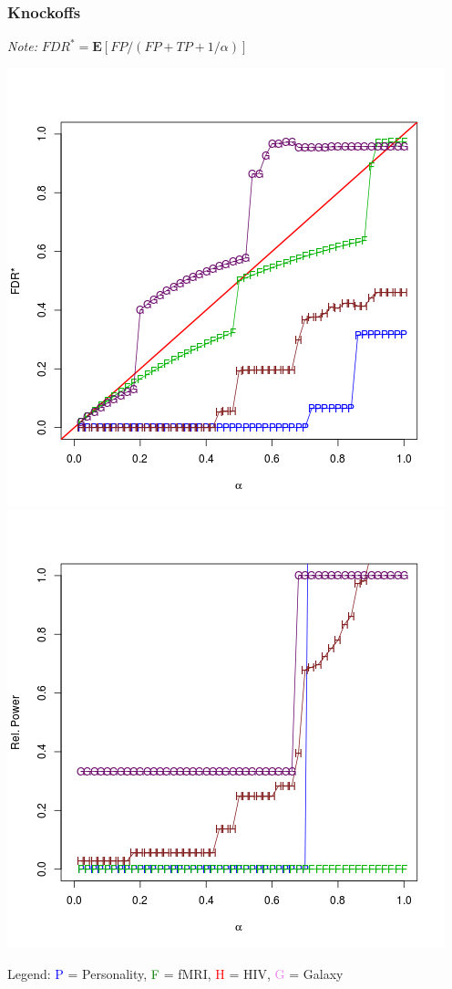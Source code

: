 \documentclass{beamer}
\newcommand{\E}{\textbf{E}}
\begin{document}
\begin{frame}
\frametitle{Knockoffs}
\emph{Note:} $FDR^* = \E[FP/(FP + TP + 1/\alpha)]$

\begin{center}
\includegraphics[scale = 0.3]{res_k_type1.png}
\includegraphics[scale = 0.3]{res_k_power.png}
\end{center}

Legend: \textcolor{blue}{P} = Personality, \textcolor{green}{F} = fMRI,
\textcolor{red}{H} = HIV, \textcolor{violet}{G} = Galaxy
\end{frame}
\end{document}

